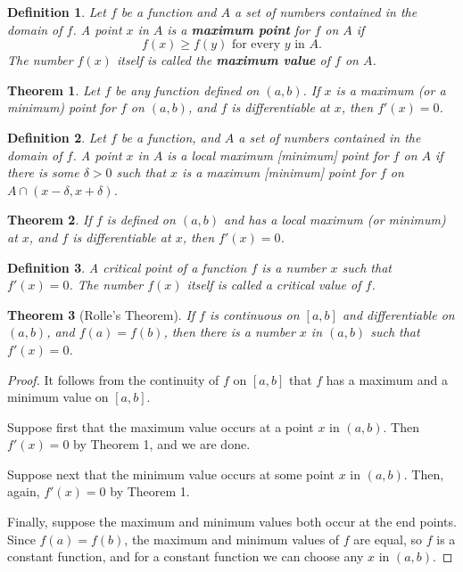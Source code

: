 \documentclass{article}
\numberwithin{corollary}{subsection}
\newtheorem{definition}{Definition}
\numberwithin{definition}{subsection}
\numberwithin{lemma}{subsection}
\newtheorem{theorem}{Theorem}
\numberwithin{theorem}{subsection}
\begin{document}
\begin{definition}
  Let $f$ be a function and $A$ a set of numbers contained in the domain of
  $f$. A point $x$ in $A$ is a \textbf{maximum point} for $f$ on $A$ if \[
    f(x) \geq f(y) \text{ for every } y \text{ in } A.
  \] The number $f(x)$ itself is called the \textbf{maximum value} of $f$ on
  $A$.
\end{definition}

\begin{theorem}
  Let $f$ be any function defined on $(a, b)$. If $x$ is a maximum (or a
  minimum) point for $f$ on $(a, b)$, and $f$ is differentiable at $x$, then
  $f'(x) = 0$.
\end{theorem}

\begin{definition}
  Let $f$ be a function, and $A$ a set of numbers contained in the domain of
  $f$. A point $x$ in $A$ is a \emph{local maximum [minimum] point} for $f$ on
  $A$ if there is some $\delta > 0$ such that $x$ is a \emph{maximum [minimum]
  point} for $f$ on $A \cap (x - \delta, x + \delta)$.
\end{definition}

\begin{theorem}
  If $f$ is defined on $(a, b)$ and has a local maximum (or minimum) at $x$,
  and $f$ is differentiable at $x$, then $f'(x) = 0$.
\end{theorem}

\begin{definition}
  A \emph{critical point} of a function $f$ is a number $x$ such that $f'(x) =
  0$. The number $f(x)$ itself is called a \emph{critical value} of $f$.
\end{definition}

\begin{theorem}[Rolle's Theorem]
  If $f$ is continuous on $[a, b]$ and differentiable on $(a, b)$, and $f(a) =
  f(b)$, then there is a number $x$ in $(a, b)$ such that $f'(x) = 0$.
\end{theorem}
\begin{proof}
  It follows from the continuity of $f$ on $[a, b]$ that $f$ has a maximum and
  a minimum value on $[a, b]$.

  Suppose first that the maximum value occurs at a point $x$ in $(a, b)$. Then
  $f'(x) = 0$ by Theorem 1, and we are done.

  Suppose next that the minimum value occurs at some point $x$ in $(a, b)$.
  Then, again, $f'(x) = 0$ by Theorem 1.

  Finally, suppose the maximum and minimum values both occur at the end points.
  Since $f(a) = f(b)$, the maximum and minimum values of $f$ are equal, so $f$
  is a constant function, and for a constant function we can choose any $x$ in
  $(a, b)$.
\end{proof}
\end{document}
